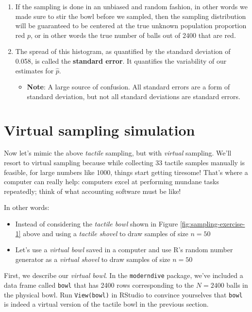 \documentclass[12pt,]{krantz}
\providecommand{\tightlist}{%
  \setlength{\itemsep}{0pt}\setlength{\parskip}{0pt}}
\theoremstyle{definition}
\theoremstyle{definition}
\theoremstyle{definition}
\theoremstyle{remark}
\begin{document}
\begin{enumerate}
\def\labelenumi{\arabic{enumi}.}
\tightlist
\item
  If the sampling is done in an unbiased and random fashion, in other
  words we made sure to stir the bowl before we sampled, then the
  sampling distribution will be guaranteed to be centered at the true
  unknown population proportion red \(p\), or in other words the true
  number of balls out of 2400 that are red.
\item
  The spread of this histogram, as quantified by the standard deviation
  of 0.058, is called the \textbf{standard error}. It quantifies the
  variability of our estimates for \(\widehat{p}\).

  \begin{itemize}
  \tightlist
  \item
    \textbf{Note}: A large source of confusion. All standard errors are
    a form of standard deviation, but not all standard deviations are
    standard errors.
  \end{itemize}
\end{enumerate}

\section{Virtual sampling simulation}\label{virtual}

Now let's mimic the above \emph{tactile} sampling, but with
\emph{virtual} sampling. We'll resort to virtual sampling because while
collecting 33 tactile samples manually is feasible, for large numbers
like 1000, things start getting tiresome! That's where a computer can
really help: computers excel at performing mundane tasks repeatedly;
think of what accounting software must be like!

In other words:

\begin{itemize}
\tightlist
\item
  Instead of considering the \emph{tactile bowl} shown in Figure
  \ref{fig:sampling-exercise-1} above and using a \emph{tactile shovel}
  to draw samples of size \(n=50\)
\item
  Let's use a \emph{virtual bowl} saved in a computer and use R's random
  number generator as a \emph{virtual shovel} to draw samples of size
  \(n=50\)
\end{itemize}

First, we describe our \emph{virtual bowl}. In the \texttt{moderndive}
package, we've included a data frame called \texttt{bowl} that has 2400
rows corresponding to the \(N=2400\) balls in the physical bowl. Run
\texttt{View(bowl)} in RStudio to convince yourselves that \texttt{bowl}
is indeed a virtual version of the tactile bowl in the previous section.
\end{document}
